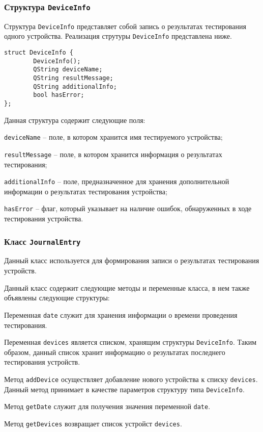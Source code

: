 \subsubsection{Структура \texttt{DeviceInfo}}
Структура \texttt{DeviceInfo} представляет собой запись о результатах тестирования одного устройства.
Реализация струтуры \texttt{DeviceInfo} представлена ниже.
\medskip
\begin{verbatim}
struct DeviceInfo {
        DeviceInfo();
        QString deviceName;
        QString resultMessage;
        QString additionalInfo;
        bool hasError;
};
\end{verbatim}
\medskip


Данная структура содержит следующие поля:
\begin{enum}
	\item \texttt{deviceName} -- поле, в котором хранится имя тестируемого устройства;
	\item \texttt{resultMessage} -- поле, в котором хранится информация о результатах тестирования;
	\item \texttt{additionalInfo} -- поле, предназначенное для хранения дополнительной информации о
		результатах тестирования устройства;
	\item \texttt{hasError} -- флаг, который указывает на наличие ошибок, обнаруженных в ходе
		тестирования устройства.
\end{enum}

\subsubsection{Класс \texttt{JournalEntry}}
Данный класс используется для формирования записи о результатах тестирования устройств.

Данный класс содержит следующие методы и переменные класса, в нем также объявлены следующие структуры:
\begin{enum}
	\item Переменная \texttt{date} служит для хранения информации о времени проведения тестирования.

	\item Переменная \texttt{devices} является списком, хранящим структуры \texttt{DeviceInfo}. Таким образом,
		данный список хранит информацию о результатах последнего тестирования устройств.

	\item Метод \texttt{addDevice} осуществляет добавление нового устройства к списку \texttt{devices}. Данный метод
		принимает в качестве параметров структуру типа \texttt{DeviceInfo}.

	\item Метод \texttt{getDate} служит для получения значения переменной \texttt{date}.

	\item Метод \texttt{getDevices} возвращает список устройст \texttt{devices}.
\end{enum}

